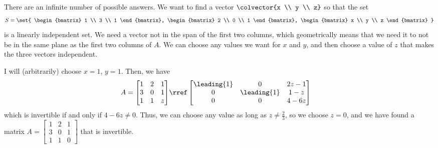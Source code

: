 There are an infinite number of possible answers.  We want to find a vector 
$\colvector{x \\ y \\ z}$ so that the set 
%
\begin{align*}
S = \set{
\begin{bmatrix} 1 \\ 3 \\ 1 \end{bmatrix}, 
\begin{bmatrix} 2 \\ 0 \\ 1 \end{bmatrix}, 
\begin{bmatrix} x \\ y \\ z \end{bmatrix}
}
\end{align*}
%
is a linearly independent set.  We need a vector not in the span of the first two columns, which geometrically means that we need it to not be in the same plane as the first two columns of $A$.  We can choose any values we want for $x$ and $y$, and then choose a value of $z$ that makes the three vectors independent.\par
%
I will (arbitrarily) choose $x = 1$, $y = 1$.  Then, we have 
%
\begin{align*}
A = \begin{bmatrix} 
1 & 2 & 1\\ 
3 & 0 & 1 \\ 
1 & 1 & z 
\end{bmatrix} 
&\rref 
\begin{bmatrix} 
\leading{1} & 0 & 2z-1 
\\ 0 & \leading{1} & 1-z
\\ 0 & 0 & 4 - 6z
\end{bmatrix}
\end{align*}
%
which is invertible if and only if $4-6z \ne 0$.  Thus, we can choose any value as long as $z \ne \frac{2}{3}$, so we choose $z = 0$, and we have found a matrix 
$A = \begin{bmatrix} 1 & 2 & 1\\ 3 & 0 & 1 \\ 1 & 1 & 0 \end{bmatrix}$ that is invertible.
